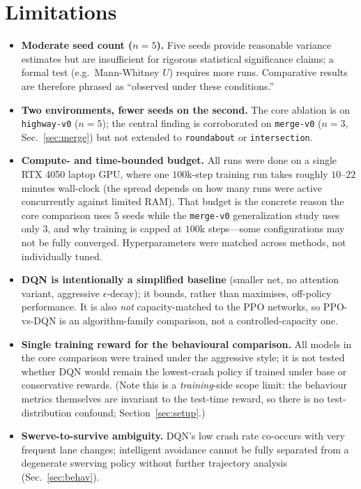 \documentclass[conference]{IEEEtran}
\newcommand{\code}[1]{\texttt{#1}}
\begin{document}
\section{Limitations}
\label{sec:limitations}
\begin{itemize}
\item \textbf{Moderate seed count ($n=5$).} Five seeds provide reasonable
variance estimates but are insufficient for rigorous statistical significance
claims; a formal test (e.g.\ Mann-Whitney $U$) requires more runs. Comparative
results are therefore phrased as ``observed under these conditions.''
\item \textbf{Two environments, fewer seeds on the second.} The core ablation is
on \code{highway-v0} ($n=5$); the central finding is corroborated on
\code{merge-v0} ($n=3$, Sec.~\ref{sec:merge}) but not extended to
\code{roundabout} or \code{intersection}.
\item \textbf{Compute- and time-bounded budget.} All runs were done on a single
RTX 4050 laptop GPU, where one $100$k-step training run takes roughly $10$--$22$
minutes wall-clock (the spread depends on how many runs were active concurrently
against limited RAM). That budget is the concrete reason the core comparison
uses $5$ seeds while the \code{merge-v0} generalization study uses only $3$, and
why training is capped at $100$k steps---some configurations may not be fully
converged. Hyperparameters were matched across methods, not individually tuned.
\item \textbf{DQN is intentionally a simplified baseline} (smaller net, no
attention variant, aggressive $\epsilon$-decay); it bounds, rather than
maximises, off-policy performance. It is also \emph{not} capacity-matched to the
PPO networks, so PPO-vs-DQN is an algorithm-family comparison, not a
controlled-capacity one.
\item \textbf{Single training reward for the behavioural comparison.} All models
in the core comparison were trained under the aggressive style; it is not tested
whether DQN would remain the lowest-crash policy if trained under base or
conservative rewards. (Note this is a \emph{training}-side scope limit: the
behaviour metrics themselves are invariant to the test-time reward, so there is
no test-distribution confound; Section~\ref{sec:setup}.)
\item \textbf{Swerve-to-survive ambiguity.} DQN's low crash rate co-occurs with
very frequent lane changes; intelligent avoidance cannot be fully separated from
a degenerate swerving policy without further trajectory analysis (Sec.~\ref{sec:behav}).
\end{itemize}
\end{document}
